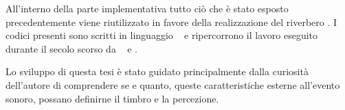 All'interno della parte implementativa tutto ciò che è stato esposto
precedentemente viene riutilizzato in favore della realizzazione del riverbero
\atmoverb. I codici presenti sono scritti in linguaggio \faust~ e ripercorrono
il lavoro eseguito durante il secolo scorso da \ms~ e \jam.

Lo sviluppo di questa tesi è stato guidato principalmente dalla curiosità
dell’autore di comprendere se e quanto, queste caratteristiche esterne all’evento
sonoro, possano definirne il timbro e la percezione.

